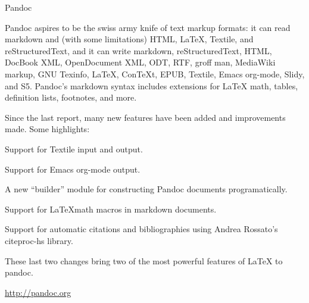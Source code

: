 \begin{hcarentry}{Pandoc}
\label{pandoc}
\makeheader

Pandoc aspires to be the swiss army knife of text markup formats: it
can read markdown and (with some limitations) HTML, LaTeX, Textile, and
reStructuredText, and it can write markdown, reStructuredText, HTML,
DocBook XML, OpenDocument XML, ODT, RTF, groff man, MediaWiki markup,
GNU Texinfo, LaTeX, ConTeXt, EPUB, Textile, Emacs org-mode,
Slidy, and S5. Pandoc's markdown syntax includes extensions for LaTeX math,
tables, definition lists, footnotes, and more.

Since the last report, many new features have been added and improvements
made.  Some highlights:
\begin{compactitem}
\item Support for Textile input and output.
\item Support for Emacs org-mode output.
\item A new ``builder'' module for constructing Pandoc documents programatically.
\item Support for \LaTeX math macros in markdown documents.
\item Support for automatic citations and bibliographies using Andrea
Rossato's citeproc-hs library.
\end{compactitem}

These last two changes bring two of the most powerful features of \LaTeX
to pandoc.

\FurtherReading
    \url{http://pandoc.org}
\end{hcarentry}
